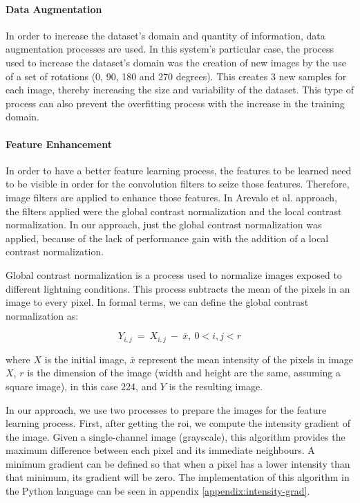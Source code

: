 \documentclass[
  twoside,
  11pt, a4paper,
  footinclude=true,
  headinclude=true,
  cleardoublepage=empty
]{scrbook}
\begin{document}
        \paragraph{Data Augmentation}
          In order to increase the dataset's domain and quantity of information, data augmentation processes are used. In this system's particular case, the process used to increase the dataset's domain was the creation of new images by the use of a set of rotations (0, 90, 180 and 270 degrees). This creates 3 new samples for each image, thereby increasing the size and variability of the dataset. This type of process can also prevent the overfitting process with the increase in the training domain.

        \paragraph{Feature Enhancement}
          In order to have a better feature learning process, the features to be learned need to be visible in order for the convolution filters to seize those features. Therefore, image filters are applied to enhance those features. In Arevalo et al. \cite{arevalo2016representation} approach, the filters applied were the global contrast normalization and the local contrast normalization. In our approach, just the global contrast normalization was applied, because of the lack of performance gain with the addition of a local contrast normalization.

          Global contrast normalization is a process used to normalize images exposed to different lightning conditions. This process subtracts the mean of the pixels in an image to every pixel. In formal terms, we can define the global contrast normalization as:

          \begin{equation}
            Y_{i,j}\ =\ X_{i,j}\ -\ \bar{x},\ 0 < i,j < r
          \end{equation}

          where $X$ is the initial image, $\bar{x}$ represent the mean intensity of the pixels in image $X$, $r$ is the dimension  of the image (width and height are the same, assuming a square image), in this case 224, and $Y$ is the resulting image.

          In our approach, we use two processes to prepare the images for the feature learning process. First, after getting the \gls{roi}, we compute the intensity gradient of the image. Given a single-channel image (grayscale), this algorithm provides the maximum difference between each pixel and its immediate neighbours. A minimum gradient can be defined so that when a pixel has a lower intensity than that minimum, its gradient will be zero. The implementation of this algorithm in the Python language can be seen in appendix \ref{appendix:intensity-grad}.
\end{document}
